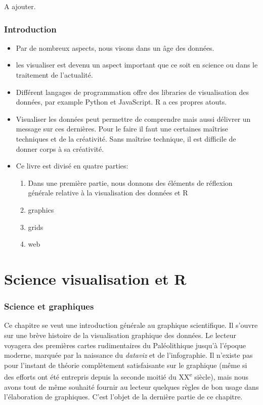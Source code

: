\documentclass[]{article}
\providecommand{\tightlist}{%
  \setlength{\itemsep}{0pt}\setlength{\parskip}{0pt}}
\begin{document}
A ajouter.

\hypertarget{introduction}{%
\section{Introduction}\label{introduction}}

\begin{itemize}
\item
  Par de nombreux aspects, nous visons dans un âge des données.
\item
  les visualiser est devenu un aspect important que ce soit en science ou dans le traitement de l'actualité.
\item
  Différent langages de programmation offre des libraries de visualisation des données, par example Python et JavaScript. R a ces propres atouts.
\item
  Visualiser les données peut permettre de comprendre mais aussi délivrer un message sur ces dernières. Pour le faire il faut une certaines maîtrise techniques et de la créativité. Sans maîtrise technique, il est difficile de donner corps à sa créativité.
\item
  Ce livre est divisé en quatre parties:

  \begin{enumerate}
  \def\labelenumi{\arabic{enumi}.}
  \tightlist
  \item
    Dans une première partie, nous donnons des éléments de réflexion générale relative à la visualisation des données et R
  \item
    graphics
  \item
    grids
  \item
    web
  \end{enumerate}
\end{itemize}

\hypertarget{part-science-visualisation-et-r}{%
\part{Science visualisation et R}\label{part-science-visualisation-et-r}}

\hypertarget{science-et-graphiques}{%
\section{Science et graphiques}\label{science-et-graphiques}}

Ce chapitre se veut une introduction générale au graphique scientifique. Il s'ouvre sur une brève histoire de la visualisation graphique des données. Le lecteur voyagera des premières cartes rudimentaires du Paléolithique jusqu'à l'époque moderne, marquée par la naissance du \emph{dataviz} et de l'infographie. Il n'existe pas pour l'instant de théorie complètement satisfaisante sur le graphique (même si des efforts ont été entrepris depuis la seconde moitié du XX\textsuperscript{e} siècle), mais nous avons tout de même souhaité fournir au lecteur quelques règles de bon usage dans l'élaboration de graphiques. C'est l'objet de la dernière partie de ce chapitre.
\end{document}
